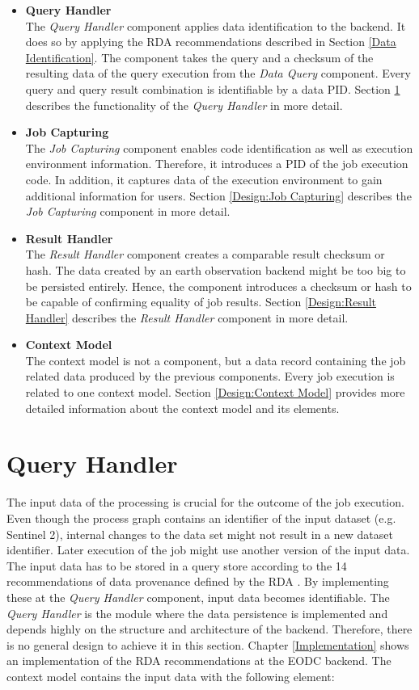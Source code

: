 \documentclass[draft,final]{vutinfth} %
\newcommand{\bgoesswein}[1]{{\color{blue}#1}}
\begin{document}
 \begin{itemize}
	\item \textbf{Query Handler} \\
	The \textit{Query Handler} component applies data identification to the backend. It does so by applying the RDA recommendations described in Section \ref{Data Identification}. The component takes the query and \bgoesswein{a checksum of the} resulting data of the query execution from the \textit{Data Query} component. Every query and query result combination is identifiable by a data PID. Section \ref{Design:Data Identification} describes the functionality of the \textit{Query Handler} in more detail.     
	\item \textbf{Job Capturing} \\ 
	The \textit{Job Capturing} component enables code identification as well as execution environment information. Therefore, it introduces a PID of the job execution code. In addition, it captures data of the execution environment to gain additional information for users. Section \ref{Design:Job Capturing} describes the \textit{Job Capturing} component in more detail.
	\item \textbf{Result Handler} \\
	The \textit{Result Handler} component creates a comparable result checksum or hash. The data created by an earth observation backend might be too big to be persisted entirely. Hence, the component introduces a checksum or hash to be capable of confirming equality of job results. Section \ref{Design:Result Handler} describes the \textit{Result Handler} component in more detail.   
	\item \textbf{Context Model} \\ 
	The context model is not a component, but a data record containing the job related data produced by the previous components. Every job execution is related to one context model. Section \ref{Design:Context Model} provides more detailed information about the context model and its elements. 
\end{itemize}

\section{Query Handler}\label{Design:Data Identification}
The input data of the processing is crucial for the outcome of the job execution. Even though the process graph contains an identifier of the input dataset (e.g. Sentinel 2), internal changes to the data set might not result in a new dataset identifier. Later execution of the job might use another version of the input data. The input data has to be stored in a query store according to the 14 recommendations of data provenance defined by the RDA \cite{rauber2016identification}. By implementing these at the \textit{Query Handler} component, input data becomes identifiable. The \textit{Query Handler} is the module where the data persistence is implemented and depends highly on the structure and architecture of the backend. Therefore, there is no general design to achieve it in this section. Chapter \ref{Implementation} shows an implementation of the RDA recommendations at the EODC backend. The context model contains the input data with the following element: 
\end{document}
